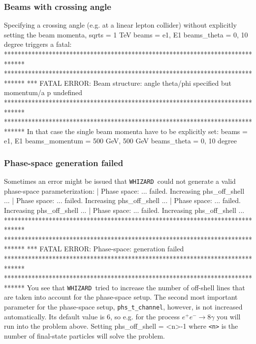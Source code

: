 \documentclass[12pt]{book}
\newenvironment{code}%
  {\begingroup\footnotesize
   \quote
   \Verbatim}%
  {\endVerbatim
   \endquote
   \endgroup\noindent}
\newenvironment{Code}%
  {\begingroup\footnotesize
   \quote
   \Verbatim[frame=single]}%
  {\endVerbatim
   \endquote
   \endgroup\noindent}
\newcommand{\ttt}[1]{\texttt{#1}}
\newcommand{\whizard}{\ttt{WHIZARD}}
\begin{document}
\subsubsection{Beams with crossing angle}

Specifying a crossing angle (e.g. at a linear lepton collider) without
explicitly setting the beam momenta,
\begin{code}
  sqrts = 1 TeV
  beams = e1, E1
  beams_theta = 0, 10 degree
\end{code}
triggers a fatal:
\begin{Code}
******************************************************************************
******************************************************************************
*** FATAL ERROR: Beam structure: angle theta/phi specified but momentum/a p undefined
******************************************************************************
******************************************************************************
\end{Code}
In that case the single beam momenta have to be explicitly set:
\begin{code}
  beams = e1, E1
  beams\_momentum = 500 GeV, 500 GeV
  beams\_theta = 0, 10 degree
\end{code}

\subsubsection{Phase-space generation failed}

Sometimes an error might be issued that \whizard\ could not generate a
valid phase-space parameterization:
\begin{Code}
| Phase space: ... failed.  Increasing phs_off_shell ...
| Phase space: ... failed.  Increasing phs_off_shell ...
| Phase space: ... failed.  Increasing phs_off_shell ...
| Phase space: ... failed.  Increasing phs_off_shell ...
******************************************************************************
******************************************************************************
*** FATAL ERROR: Phase-space: generation failed
******************************************************************************
******************************************************************************
\end{Code}
You see that \whizard\ tried to increase the number of off-shell lines
that are taken into account for the phase-space setup. The second most
important parameter for the phase-space setup, \ttt{phs\_t\_channel},
however, is not increased automatically. Its default value is $6$, so
e.g. for the process $e^+ e^- \to 8\gamma$ you will run into the
problem above. Setting
\begin{code}
phs_off_shell = <n>-1
\end{code}
where \ttt{<n>} is the number of final-state particles will solve the problem.
\end{document}
